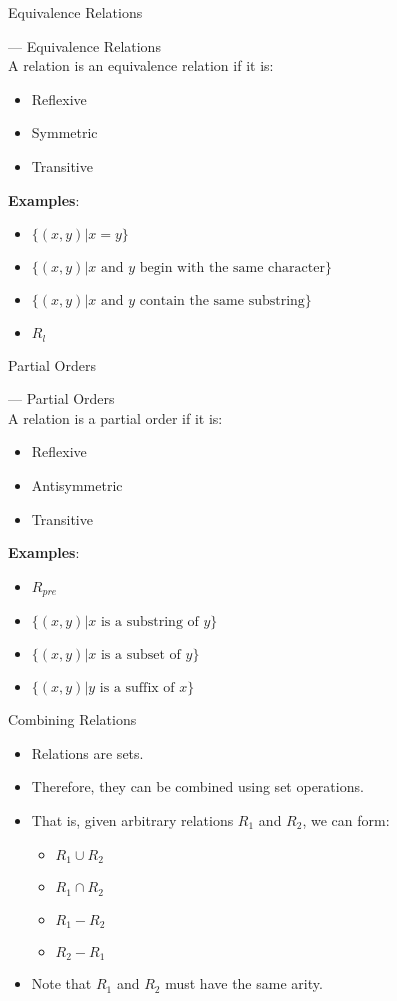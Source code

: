 \documentclass[style=sailor,size=12pt]{powerdot}
\begin{document}
\begin{slide}[bm=,toc=]{Equivalence Relations}
\begin{defn}{--- Equivalence Relations}~\\
A relation is an equivalence relation if it is:

\begin{itemize}
\item Reflexive
\item Symmetric
\item Transitive
\end{itemize}
\end{defn}
\textbf{Examples}:
\begin{itemize}
\item $\{(x,y) | x = y \}$
\item $\{(x,y) | x \text{ and } y \text{ begin with the same character}\}$
\item $\{(x,y) | x \text{ and } y \text{ contain the same substring}\}$
\item $R_{l}$ 
\end{itemize}
\end{slide}

\begin{slide}[bm=,toc=]{Partial Orders}
\begin{defn}{--- Partial Orders}~\\
A relation is a partial order if it is:

\begin{itemize}
\item Reflexive
\item Antisymmetric
\item Transitive
\end{itemize}
\textbf{Examples}:
\begin{itemize}
\item $R_{pre}$
\item $\{(x,y) | x \text{ is a substring of } y \}$
\item $\{(x,y) | x \text{ is a subset of } y \}$
\item $\{(x,y) | y \text{ is a suffix of } x \}$
\end{itemize}
\end{defn}
\end{slide}
\begin{slide}[bm=,toc=]{Combining Relations}
\begin{itemize}
\item Relations are sets.
\item Therefore, they can be combined using set operations.
\item That is, given arbitrary relations $R_1$ and $R_2$, we can form:
\begin{itemize}
\item $R_1 \cup R_2$
\item $R_1 \cap R_2$
\item $R_1 - R_2$
\item $R_2 - R_1$
\end{itemize}
\item Note that $R_1$ and $R_2$ must have the same arity.
\end{itemize}
\end{slide}
\end{document}
